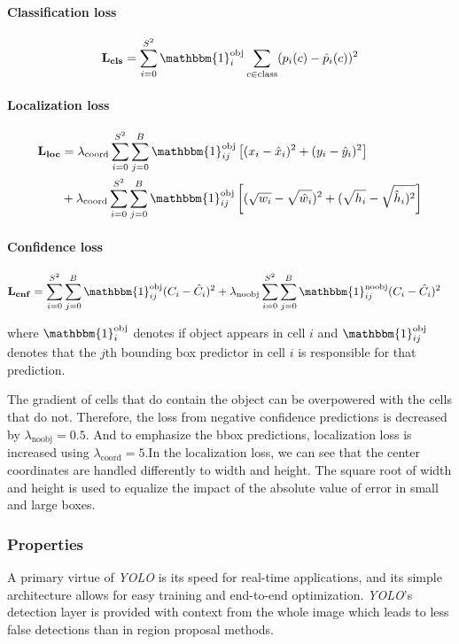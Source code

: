 \paragraph{Classification loss}
\begin{align*}
\mathbf{L_{cls}} = \sum_{i=0}^{S^2}\mathbbm{1}_i^{\text{obj}} \sum_{c\in \text{class}} (p_i(c) - \hat{p}_i(c))^2
\end{align*}

\paragraph{Localization loss}
\begin{align*}
\mathbf{L_{loc}} &= \lambda_{\text{coord}} \sum_{i=0}^{S^2} \sum_{j=0}^B \mathbbm{1}_{ij}^{\text{obj}} \left[(x_i - \hat{x}_i)^2 + (y_i - \hat{y}_i)^2\right] \\
 &+  \lambda_{\text{coord}} \sum_{i=0}^{S^2} \sum_{j=0}^B \mathbbm{1}_{ij}^{\text{obj}} \left[(\sqrt{w_i} - \sqrt{\hat{w}_i})^2 + (\sqrt{h_i} - \sqrt{\hat{h}_i)^2}\right]
\end{align*}

\paragraph{Confidence loss}
\begin{align*}
\mathbf{L_{cnf}} &= \sum_{i=0}^{S^2} \sum_{j=0}^B \mathbbm{1}_{ij}^{\text{obj}} (C_i - \hat{C}_i)^2 
+ \lambda_{\text{noobj}} \sum_{i=0}^{S^2} \sum_{j=0}^B \mathbbm{1}_{ij}^{\text{noobj}} (C_i - \hat{C}_i)^2
\end{align*}

\noindent where $\mathbbm{1}^{\text{obj}}_i$ denotes if object appears in cell $i$ and $\mathbbm{1}^{\text{obj}}_{ij}$ denotes that the $j$th bounding box predictor in cell $i$ is responsible for that prediction.

The gradient of cells that do contain the object can be overpowered with the cells that do not.  Therefore, the loss from negative confidence predictions is decreased by $\lambda_{\text{noobj}} = 0.5$. And to emphasize the bbox predictions, localization loss is increased using $\lambda_{\text{coord}} = 5$.In the localization loss, we can see that the center coordinates are handled differently to width and height. The square root of width and height is used to equalize the impact of the absolute value of error in small and large boxes.


\subsubsection{Properties}
A primary virtue of \textit{YOLO} is its speed for real-time applications, and its simple architecture allows for easy training and end-to-end optimization. \textit{YOLO}'s detection layer is provided with context from the whole image which leads to less false detections than in region proposal methods. 

